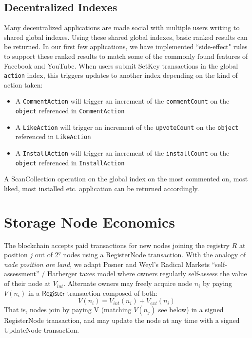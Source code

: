 \documentclass[journal]{IEEEtran}
\newcommand{\tx}[1]{\textsf{#1}}
\begin{document}
\subsection{Decentralized Indexes}
\label{sec:sideeffects}

Many decentralized applications are made social with multiple users writing to shared  global indexes.  Using these shared global indexes, basic ranked results can be returned.  In our first few applications, we have implemented ``side-effect" rules to support these ranked results to match some of the commonly found features of Facebook and YouTube.   When users submit \tx{SetKey} transactions in the global {\tt action} index, this triggers updates to another index depending on the kind of action taken:

\begin{itemize}
    \item A {\tt CommentAction} will trigger an increment of the {\tt commentCount} on the {\tt object} referenced in {\tt CommentAction}
    \item A {\tt LikeAction} will trigger an increment of the {\tt upvoteCount} on the {\tt object} referenced in {\tt LikeAction}
    \item A {\tt InstallAction} will trigger an increment of the {\tt installCount} on the {\tt object} referenced in {\tt InstallAction}
\end{itemize}

A \tx{ScanCollection} operation on the global index on the most commented on, most liked, most installed etc. application can be returned accordingly.

\section{Storage Node Economics}
\label{sec:rewards}

The blockchain accepts paid transactions for new nodes joining the registry $R$ at position $j$ out of $2^q$ nodes using a \tx{RegisterNode} transaction.  With the analogy of {\em node position are land}, we adapt Posner and Weyl's Radical Markets \cite{radicalmarkets} ``self-assessment'' / Harberger taxes model where owners regularly self-assess the value of their node at $V_{int}$.  Alternate owners may freely acquire node $n_i$ by paying $V(n_i)$ in a  $\tx{Register}$ transaction composed of both:
\[
    V(n_i) = V_{int}(n_i) + V_{ext}(n_i)
\]
That is, nodes join by paying \tx{V} (matching $V(n_j)$ see below) in a signed \tx{RegisterNode} transaction, and may update the node at any time with a signed \tx{UpdateNode} transaction.
\end{document}
